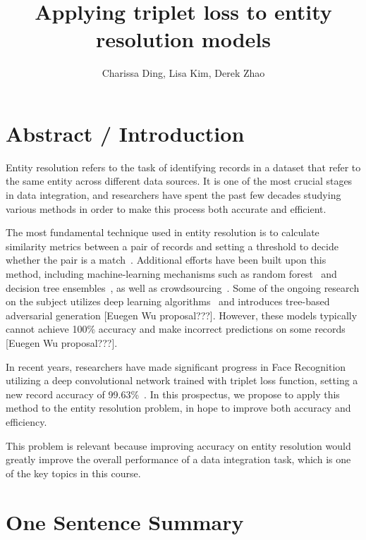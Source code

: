 \documentclass{proc}
\begin{document}
\title{Applying triplet loss to entity resolution models}

\author{Charissa Ding, Lisa Kim, Derek Zhao}

\maketitle

\section{Abstract / Introduction}

Entity resolution refers to the task of identifying records in a dataset that refer to the same entity across different data sources. It is one of the most crucial stages in data integration, and researchers have spent the past few decades studying various methods in order to make this process both accurate and efficient.

The most fundamental technique used in entity resolution is to calculate similarity metrics between a pair of records and setting a threshold to decide whether the pair is a match~\cite{elmagarmid2007duplicate}. Additional efforts have been built upon this method, including machine-learning mechanisms such as random forest~\cite{varma2017relic} and decision tree ensembles~\cite{yi2017method}, as well as crowdsourcing~\cite{gokhale2014corleone,wang2012crowder}. Some of the ongoing research on the subject utilizes deep learning algorithms~\cite{ebraheem2017deeper} and introduces tree-based adversarial generation [Euegen Wu proposal???]. However, these models typically cannot achieve 100\% accuracy and make incorrect predictions on some records [Euegen Wu proposal???]. 

In recent years, researchers have made significant progress in Face Recognition utilizing a deep convolutional network trained with triplet loss function, setting a new record accuracy of 99.63\%~\cite{schroff2015facenet}. In this prospectus, we propose to apply this method to the entity resolution problem, in hope to improve both accuracy and efficiency.

This problem is relevant because improving accuracy on entity resolution would greatly improve the overall performance of a data integration task, which is one of the key topics in this course.

\section{One Sentence Summary}
\end{document}
